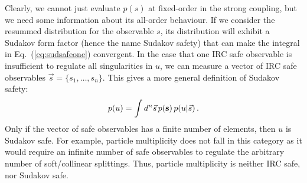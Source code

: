 Clearly, we cannot just evaluate $p(s)$ at fixed-order in the strong coupling, but we need some information about its all-order behaviour.  If we consider the resummed distribution for the observable $s$, its distribution will exhibit a Sudakov form factor (hence the name Sudakov safety) that can make the integral in Eq.~(\ref{eq:sudsafeone}) convergent. 
%
In the case that one IRC safe observable is insufficient to regulate all singularities in $u$, we can measure a vector of IRC safe observables $\vec{s}=\{s_1,\dotsc,s_n\}$.  This gives a more general definition of Sudakov safety:
\begin{equation}\label{eq:sudsafedef}
p(u)= \int d^n\vec{s} \, p({\bf s})\, p(u| \vec{s}) \,.
\end{equation}
Only if the vector of safe observables has a finite number of elements, then $u$ is Sudakov safe. For example, particle multiplicity does not fall in this category as it would require an infinite number of safe observables to regulate the arbitrary number of soft/collinear splittings. Thus, particle multiplicity is neither IRC safe, nor Sudakov safe. 



